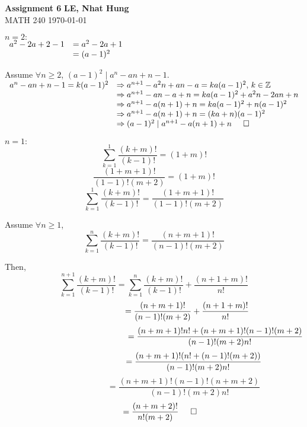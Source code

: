 \documentclass[a4paper, 11pt]{article}
\begin{document}
\noindent
\large\textbf{Assignment 6} \hfill \textbf{LE, Nhat Hung} \\
\normalsize MATH 240 \hfill \today

\begin{myEnumerate}
	\item
	\begin{myEnumerate}
    	\item
        $ n = 2: $ \\ \(
        \begin{array}{ll}
        	a^{2} - 2a + 2 - 1 & = a^{2} - 2a + 1 \\
            				   & = (a - 1)^{2}
        \end{array} \\ \)
        
        Assume $\forall n \geq 2$, $(a - 1)^{2} \mid a^{n} - an + n - 1$. \\
        
        \(
        \begin{array}{ll}
        	a^{n} - an + n - 1 = k(a - 1)^{2} & \Rightarrow a^{n+1} - a^{2}n + an - a = ka(a - 1)^{2}$, $ k \in \mathbb{Z} \\
											  & \Rightarrow a^{n+1} - an - a + n = ka(a - 1)^{2} + a^{2}n - 2an + n \\
                                              & \Rightarrow a^{n+1} - a(n + 1) + n = ka(a - 1)^{2} + n(a - 1)^{2} \\
                                              & \Rightarrow a^{n+1} - a(n + 1) + n = (ka + n)(a - 1)^{2} \\
                                              & \Rightarrow (a - 1)^{2} \mid a^{n + 1} - a(n + 1) + n \hspace{0.5cm} \square
        \end{array} \\ \)
        
        \item
        $ n = 1: $
        $$ \sum_{k=1}^1 \frac{(k+m)!}{(k-1)!} = (1 + m)! $$
        $$ \frac{(1 + m + 1)!}{(1 - 1)!(m + 2)} = (1 + m)! $$
        $$ \sum_{k=1}^1 \frac{(k+m)!}{(k-1)!} = \frac{(1 + m + 1)!}{(1 - 1)!(m + 2)} $$
        
        Assume $\forall n \geq 1$,
        $$\sum_{k=1}^n \frac{(k+m)!}{(k-1)!} = \frac{(n + m + 1)!}{(n - 1)!(m + 2)} $$
        
        Then,
        $$ \sum_{k=1}^{n+1} \frac{(k+m)!}{(k-1)!} = \sum_{k=1}^n \frac{(k+m)!}{(k-1)!} + \frac{(n + 1 + m)!}{n!} $$
        $$ \hspace{2.8cm} = \frac{(n + m + 1)!}{(n - 1)!(m + 2)} + \frac{(n + 1 + m)!}{n!} $$
        $$ \hspace{5.2cm} = \frac{(n+m+1)!n! + (n+m+1)!(n-1)!(m+2)}{(n-1)!(m+2)n!} $$
        $$ \hspace{3.4cm} = \frac{(n+m+1)!(n! + (n-1)!(m+2))}{(n-1)!(m+2)n!} $$
        $$ \hspace{3cm} = \frac{(n+m+1)!(n-1)!(n + m + 2)}{(n-1)!(m+2)n!} $$
        $$ \hspace{0.5cm} = \frac{(n+m+2)!}{n!(m+2)} \hspace{0.5cm} \square $$
        

\end{myEnumerate}
\end{myEnumerate}
\end{document}
